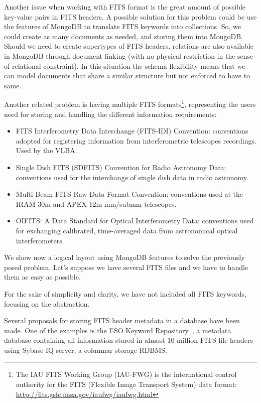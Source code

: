 Another issue when working with FITS format is the great amount of possible key-value pairs in FITS headers. A possible solution for this problem could be use the features of MongoDB to translate FITS keywords into collections. So, we could create as
many %
documents as needed, and storing them into MongoDB. Should we need to create supertypes of FITS headers, relations are also available in MongoDB through document linking (with no physical restriction in the sense of relational constraint). In this situation the schema flexibility means that we can model documents that share a similar structure but not enforced to have to same.

Another related problem is having multiple FITS formats\footnote{The IAU FITS Working Group (IAU-FWG) is the international control authority for the FITS (Flexible Image Transport System) data format: \url{http://fits.gsfc.nasa.gov/iaufwg/iaufwg.html}}, representing the users need for storing and handling the different information requirements:

\begin{itemize}
\item FITS Interferometry Data Interchange (FITS-IDI) Convention: conventions adopted for registering information from interferometric telescopes recordings. Used by the VLBA.
\item Single Dish FITS (SDFITS) Convention for Radio Astronomy Data: conventions used for the interchange of single dish data in radio astronomy. 
\item Multi-Beam FITS Raw Data Format Convention: conventions used at the IRAM 30m and APEX 12m mm/submm telescopes.
\item OIFITS: A Data Standard for Optical Interferometry Data: conventions used for exchanging calibrated, time-averaged data from astronomical optical interferometers.
\end{itemize}


We show now a logical layout using MongoDB features to solve the previously posed problem. Let's suppose we have several FITS files and we have to handle them as easy as possible.

For the sake of simplicity and clarity, we have not included all FITS keywords, focusing on the abstraction.

Several proposals
for storing
FITS
header metadata
in a database have been made. One of the examples is the ESO 
Keyword Repository~\cite{2008SPIE.7016E..51V}, a metadata database containing all information stored in almost 10 million FITS file headers using Sybase IQ server, a columnar storage RDBMS.


